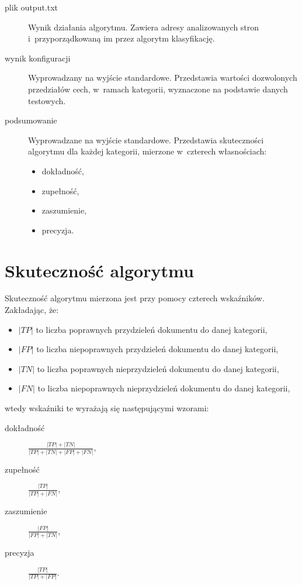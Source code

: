 \documentclass[a4paper,11pt]{article}
\begin{document}
\begin{description}
    \item[plik output.txt] Wynik działania algorytmu. Zawiera adresy analizowanych stron i~przyporządkowaną im przez algorytm klasyfikację.
    \item[wynik konfiguracji] Wyprowadzany na wyjście standardowe. Przedstawia wartości dozwolonych przedziałów cech, w~ramach kategorii, wyznaczone na podstawie danych testowych.
    \item[podsumowanie] Wyprowadzane na wyjście standardowe. Przedstawia skuteczności algorytmu dla każdej kategorii, mierzone w~czterech własnościach:
        \begin{itemize}
            \item dokładność,
            \item zupełność,
            \item zaszumienie,
            \item precyzja.
        \end{itemize}
\end{description}

\section{Skuteczność algorytmu}

Skuteczność algorytmu mierzona jest przy pomocy czterech wskaźników. Zakładając, że:
 
\begin{itemize}
 \item $|TP|$ to liczba poprawnych przydzieleń dokumentu do danej kategorii, 
 \item $|FP|$ to liczba niepoprawnych przydzieleń dokumentu do danej kategorii,
 \item $|TN|$ to liczba poprawnych nieprzydzieleń dokumentu do danej kategorii,
 \item $|FN|$ to liczba niepoprawnych nieprzydzieleń dokumentu do danej kategorii,
\end{itemize}

wtedy wskaźniki te wyrażają się następującymi wzorami:

\begin{description}
    \item[dokładność] $\frac{|TP| + |TN|}{|TP| + |TN| + |FP| + |FN|}$,
    \item[zupełność] $\frac{|TP|}{|TP| + |FN|}$,
    \item[zaszumienie] $\frac{|FP|}{|FP| + |TN|}$,
    \item[precyzja] $\frac{|TP|}{|TP| + |FP|}$.
\end{description}
\end{document}
